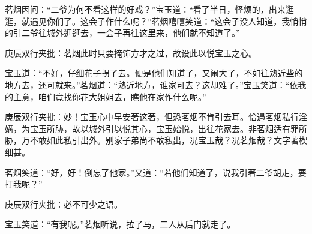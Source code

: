\begin{parag}


    茗烟因问：“二爷为何不看这样的好戏？”宝玉道：“看了半日，怪烦的，出来逛逛，就遇见你们了。这会子作什么呢？”茗烟嘻嘻笑道：“这会子没人知道，我悄悄的引二爷往城外逛逛去，一会子再往这里来，他们就不知道了。”\begin{note}庚辰双行夹批：茗烟此时只要掩饰方才之过，故设此以悦宝玉之心。\end{note}宝玉道：“不好，仔细花子拐了去。便是他们知道了，又闹大了，不如往熟近些的地方去，还可就来。”茗烟道：“熟近地方，谁家可去？这却难了。”宝玉笑道：“依我的主意，咱们竟找你花大姐姐去，瞧他在家作什么呢。”\begin{note}庚辰双行夹批：妙！宝玉心中早安著这著，但恐茗烟不肯引去耳。恰遇茗烟私行淫媾，为宝玉所胁，故以城外引以悦其心，宝玉始悦，出往花家去。非茗烟适有罪所胁，万不敢如此私引出外。别家子弟尚不敢私出，况宝玉哉？况茗烟哉？文字著楔细甚。\end{note}茗烟笑道：“好，好！倒忘了他家。”又道：“若他们知道了，说我引著二爷胡走，要打我呢？”\begin{note}庚辰双行夹批：必不可少之语。\end{note}宝玉笑道：“有我呢。”茗烟听说，拉了马，二人从后门就走了。
\end{parag}


